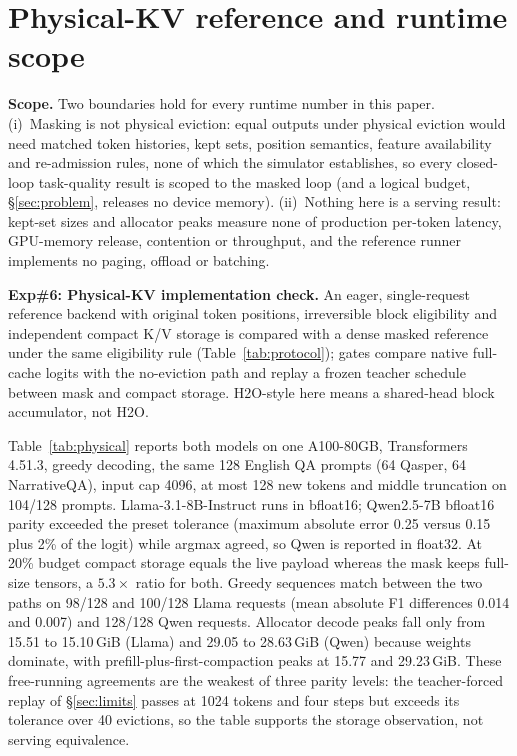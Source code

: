 \section{Physical-KV reference and runtime scope}
\label{sec:deploy}

\textbf{Scope.} Two boundaries hold for every runtime number in this paper. (i)~Masking
is not physical eviction: equal outputs under physical eviction would need matched token
histories, kept sets, position semantics, feature availability and re-admission rules,
none of which the simulator establishes, so every closed-loop task-quality result is
scoped to the masked loop (and a logical budget, \S\ref{sec:problem}, releases no device
memory). (ii)~Nothing here is a serving result: kept-set sizes and allocator peaks
measure none of production per-token latency, GPU-memory release, contention or
throughput, and the reference runner implements no paging, offload or batching.

\textbf{Exp\#6: Physical-KV implementation check.} An eager, single-request reference
backend with original token positions, irreversible block eligibility and independent
compact K/V storage is compared with a dense masked reference under the same
eligibility rule (Table~\ref{tab:protocol}); gates compare native full-cache logits
with the no-eviction path and replay a frozen teacher schedule between mask and compact
storage. H2O-style here means a shared-head block accumulator, not H2O.

Table~\ref{tab:physical} reports both models on one A100-80GB, Transformers 4.51.3,
greedy decoding, the same 128 English QA prompts (64 Qasper, 64 NarrativeQA), input
cap 4096, at most 128 new tokens and middle truncation on 104/128 prompts.
Llama-3.1-8B-Instruct runs in bfloat16; Qwen2.5-7B bfloat16 parity exceeded the
preset tolerance (maximum absolute error 0.25 versus 0.15 plus 2\% of the logit) while
argmax agreed, so
Qwen is reported in float32. At 20\% budget compact storage equals the live payload
whereas the mask keeps full-size tensors, a $5.3\times$ ratio for both. Greedy
sequences match between the two paths on 98/128 and 100/128 Llama requests (mean
absolute F1 differences 0.014 and 0.007) and 128/128 Qwen requests. Allocator decode
peaks fall only from 15.51 to 15.10\,GiB (Llama) and 29.05 to 28.63\,GiB (Qwen)
because weights dominate, with prefill-plus-first-compaction peaks at 15.77 and
29.23\,GiB. These free-running agreements are the weakest of three parity levels: the
teacher-forced replay of \S\ref{sec:limits} passes at 1024 tokens and four steps but
exceeds its tolerance over 40 evictions, so the table supports the storage
observation, not serving equivalence.

